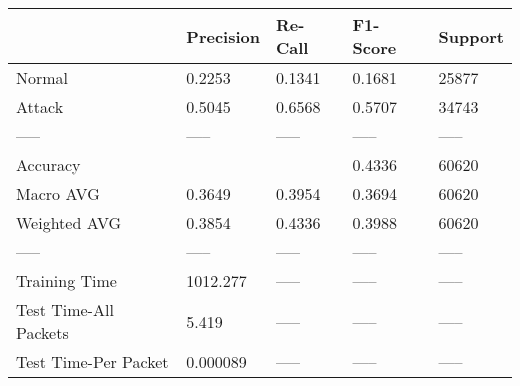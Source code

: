 \begin{tabular}{lllll}
\toprule
{} & Precision & Re-Call & F1-Score & Support \\
\midrule
Normal                &    0.2253 &  0.1341 &   0.1681 &   25877 \\
Attack                &    0.5045 &  0.6568 &   0.5707 &   34743 \\
-----                 &     ----- &   ----- &    ----- &   ----- \\
Accuracy              &           &         &   0.4336 &   60620 \\
Macro AVG             &    0.3649 &  0.3954 &   0.3694 &   60620 \\
Weighted AVG          &    0.3854 &  0.4336 &   0.3988 &   60620 \\
-----                 &     ----- &   ----- &    ----- &   ----- \\
Training Time         &  1012.277 &   ----- &    ----- &   ----- \\
Test Time-All Packets &     5.419 &   ----- &    ----- &   ----- \\
Test Time-Per Packet  &  0.000089 &   ----- &    ----- &   ----- \\
\bottomrule
\end{tabular}
